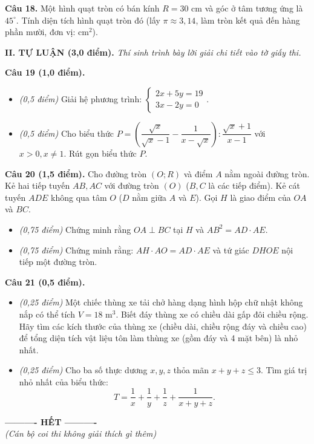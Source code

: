 \documentclass[11pt,a4paper]{article}
\begin{document}
\vspace{1.5mm}
\textbf{Câu 18.} Một hình quạt tròn có bán kính $R = 30\text{ cm}$ và góc ở tâm tương ứng là $45^\circ$. Tính diện tích hình quạt tròn đó (lấy $\pi \approx 3{,}14$, làm tròn kết quả đến hàng phần mười, đơn vị: $\text{cm}^2$).

\vspace{4mm}
\noindent
\textbf{\large II. TỰ LUẬN (3,0 điểm).} \textit{Thí sinh trình bày lời giải chi tiết vào tờ giấy thi.}

\vspace{2mm}
\textbf{Câu 19 (1,0 điểm).}
\begin{itemize}
  \item[a)] \textit{(0,5 điểm)} Giải hệ phương trình: $\begin{cases} 2x + 5y = 19 \\ 3x - 2y = 0 \end{cases}$.
  \item[b)] \textit{(0,5 điểm)} Cho biểu thức $P = \left( \dfrac{\sqrt{x}}{\sqrt{x}-1} - \dfrac{1}{x-\sqrt{x}} \right) : \dfrac{\sqrt{x}+1}{x-1}$ với $x > 0, x \ne 1$. Rút gọn biểu thức $P$.
\end{itemize}

\vspace{2mm}
\textbf{Câu 20 (1,5 điểm).} Cho đường tròn $(O; R)$ và điểm $A$ nằm ngoài đường tròn. Kẻ hai tiếp tuyến $AB, AC$ với đường tròn $(O)$ ($B, C$ là các tiếp điểm). Kẻ cát tuyến $ADE$ không qua tâm $O$ ($D$ nằm giữa $A$ và $E$). Gọi $H$ là giao điểm của $OA$ và $BC$.
\begin{itemize}
  \item[a)] \textit{(0,75 điểm)} Chứng minh rằng $OA \perp BC$ tại $H$ và $AB^2 = AD \cdot AE$.
  \item[b)] \textit{(0,75 điểm)} Chứng minh rằng: $AH \cdot AO = AD \cdot AE$ và tứ giác $DHOE$ nội tiếp một đường tròn.
\end{itemize}

\vspace{2mm}
\textbf{Câu 21 (0,5 điểm).}
\begin{itemize}
  \item[a)] \textit{(0,25 điểm)} Một chiếc thùng xe tải chở hàng dạng hình hộp chữ nhật không nắp có thể tích $V = 18\text{ m}^3$. Biết đáy thùng xe có chiều dài gấp đôi chiều rộng. Hãy tìm các kích thước của thùng xe (chiều dài, chiều rộng đáy và chiều cao) để tổng diện tích vật liệu tôn làm thùng xe (gồm đáy và 4 mặt bên) là nhỏ nhất.
  \item[b)] \textit{(0,25 điểm)} Cho ba số thực dương $x, y, z$ thỏa mãn $x + y + z \le 3$. Tìm giá trị nhỏ nhất của biểu thức:
  \[
  T = \dfrac{1}{x} + \dfrac{1}{y} + \dfrac{1}{z} + \dfrac{1}{x + y + z}.
  \]
\end{itemize}

\vspace{4mm}
\begin{center}
\textbf{---------- HẾT ----------}\\
\textit{(Cán bộ coi thi không giải thích gì thêm)}
\end{center}
\end{document}

